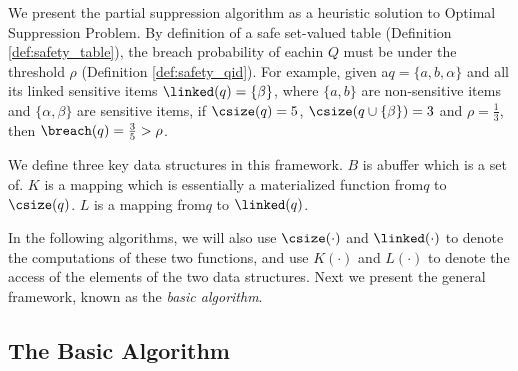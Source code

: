 We present the partial suppression algorithm as a heuristic
solution to Optimal Suppression Problem.
By definition of a safe set-valued table (Definition \ref{def:safety_table}),
the breach probability of each\qid in $Q$
must be under the threshold $\rho$ (Definition \ref{def:safety_qid}).
For example, given a\qid $q=\{a, b, \alpha\}$ and all its linked
sensitive items $\linked(q)=\{\beta\}$, where $\{a, b\}$ are
non-sensitive items and $\{\alpha, \beta\}$ are sensitive items,
if $\csize(q)=5$, $\csize(q \cup \{\beta\})=3$ and
$\rho=\frac{1}{3}$, then $\breach(q)=\frac{3}{5}>\rho$.


\begin{definition}
We define three key data structures in this framework. 
$B$ is a\qid buffer which is a set of\qidsx. 
$K$ is a mapping which is essentially a materialized function from\qid $q$ to $\csize(q)$. 
$L$ is a mapping from\qid $q$ to $\linked(q)$. 
\end{definition}
In the following algorithms, we will also use 
$\csize(\cdot)$ and $\linked(\cdot)$ 
to denote the computations of these two functions, and 
use $K(\cdot)$ and $L(\cdot)$ to denote the access of the elements
of the two data structures.
%
Next we present the general framework, known as the {\em basic algorithm}.

\subsection{The Basic Algorithm}

